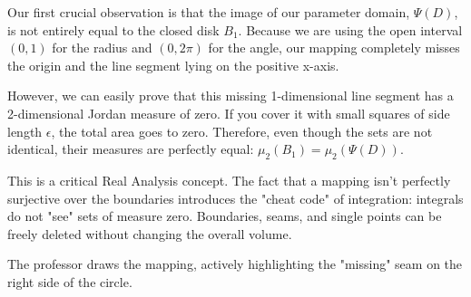 \begin{spoken_clean}[00:18:37 - 00:20:17]
Our first crucial observation is that the image of our parameter domain, $\Psi(D)$, is not entirely equal to the closed disk $B_1$. Because we are using the open interval $(0,1)$ for the radius and $(0, 2\pi)$ for the angle, our mapping completely misses the origin and the line segment lying on the positive x-axis. 

However, we can easily prove that this missing 1-dimensional line segment has a 2-dimensional Jordan measure of zero. If you cover it with small squares of side length $\epsilon$, the total area goes to zero. Therefore, even though the sets are not identical, their measures are perfectly equal: $\mu_2(B_1) = \mu_2(\Psi(D))$.
\end{spoken_clean}

\begin{didactic_insight}
This is a critical Real Analysis concept. The fact that a mapping isn't perfectly surjective over the boundaries introduces the "cheat code" of integration: integrals do not "see" sets of measure zero. Boundaries, seams, and single points can be freely deleted without changing the overall volume.
\end{didactic_insight}

\begin{nice-box}
The professor draws the mapping, actively highlighting the "missing" seam on the right side of the circle.
\end{nice-box}

\begin{math_stroke}
\begin{center}
\end{center}
\end{math_stroke}

